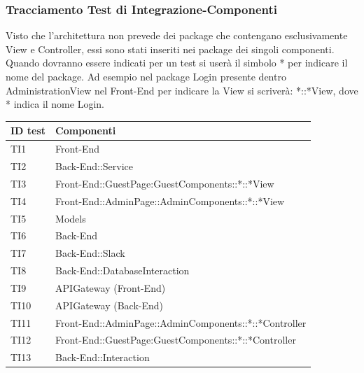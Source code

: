 \documentclass[../PianoDiQualifica_v4.0.0.tex]{subfiles}
\begin{document}
	\subsubsection{Tracciamento Test di Integrazione-Componenti}
	Visto che l'architettura non prevede dei package che contengano esclusivamente View e Controller, essi sono stati inseriti nei package dei singoli componenti. Quando dovranno essere indicati per un test si userà il simbolo * per indicare il nome del package. Ad esempio nel package Login presente dentro AdministrationView nel Front-End per indicare la View si scriverà: *::*View, dove * indica il nome Login.
	\begin{longtable}[c] { >{\centering\arraybackslash}p{2cm} >{\centering\arraybackslash}p{11cm}}
		\toprule
		\centerline{\textbf{ID test}} & \centerline{\textbf{Componenti}} \\
			\midrule
			TI1 & Front-End \\
			\addlinespace[0.3em]
			\midrule
			\addlinespace[0.3em]
			TI2 & Back-End::Service \\
			\addlinespace[0.3em]
			\midrule
			\addlinespace[0.3em]
			TI3 & Front-End::GuestPage:GuestComponents::*::*View \\
			\addlinespace[0.3em]
			\midrule
			\addlinespace[0.3em]
			TI4 & Front-End::AdminPage::AdminComponents::*::*View \\
			\addlinespace[0.3em]
			\midrule
			\addlinespace[0.3em]
			TI5 & Models \\
			\addlinespace[0.3em]
			\midrule
			\addlinespace[0.3em]
			TI6 & Back-End \\
			\addlinespace[0.3em]
			\midrule
			\addlinespace[0.3em]
			TI7 & Back-End::Slack \\
			\addlinespace[0.3em]
			\midrule
			\addlinespace[0.3em]
			TI8 & Back-End::DatabaseInteraction \\
			\addlinespace[0.3em]
			\midrule
			\addlinespace[0.3em]
			TI9 & APIGateway (Front-End)\\
			\addlinespace[0.3em]
			\midrule
			\addlinespace[0.3em]
			TI10 & APIGateway (Back-End) \\
			\addlinespace[0.3em]
			\midrule
			\addlinespace[0.3em]
			TI11 &  Front-End::AdminPage::AdminComponents::*::*Controller \\
			\addlinespace[0.3em]
			\midrule
			\addlinespace[0.3em]
			TI12 & Front-End::GuestPage:GuestComponents::*::*Controller \\
			\addlinespace[0.3em]
			\midrule
			\addlinespace[0.3em]
			TI13 & Back-End::Interaction \\

\end{longtable}
\end{document}
